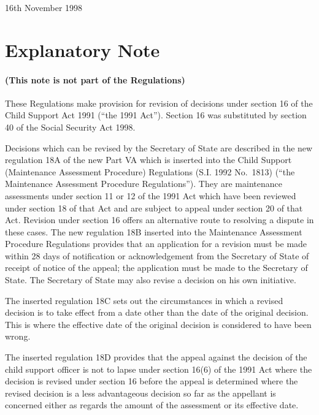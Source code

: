 \documentclass[12pt,a4paper]{article}
\begin{document}
16th November 1998

\small

\part{Explanatory Note}

\renewcommand\parthead{--- Explanatory Note}

\subsection*{(This note is not part of the Regulations)}

These Regulations make provision for revision of decisions under section 16 of the Child Support Act 1991 (“the 1991 Act”). Section 16 was substituted by section 40 of the Social Security Act 1998.

  Decisions which can be revised by the Secretary of State are described in the new regulation 18A of the new Part VA which is inserted into the Child Support (Maintenance Assessment Procedure) Regulations (S.I. 1992 No.\ 1813) (“the Maintenance Assessment Procedure Regulations”). They are maintenance assessments under section 11 or 12 of the 1991 Act which have been reviewed under section 18 of that Act and are subject to appeal under section 20 of that Act. Revision under section 16 offers an alternative route to resolving a dispute in these cases. The new regulation 18B inserted into the Maintenance Assessment Procedure Regulations provides that an application for a revision must be made within 28 days of notification or acknowledgement from the Secretary of State of receipt of notice of the appeal; the application must be made to the Secretary of State. The Secretary of State may also revise a decision on his own initiative.

  The inserted regulation 18C sets out the circumstances in which a revised decision is to take effect from a date other than the date of the original decision. This is where the effective date of the original decision is considered to have been wrong.

  The inserted regulation 18D provides that the appeal against the decision of the child support officer is not to lapse under section 16(6) of the 1991 Act where the decision is revised under section 16 before the appeal is determined where the revised decision is a less advantageous decision so far as the appellant is concerned either as regards the amount of the assessment or its effective date.
\end{document}
